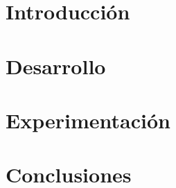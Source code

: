 \documentclass[a4paper, 10pt, twoside]{article}
\begin{document}
\newpage

\tableofcontents

\newpage

\section{Introducción}



\section{Desarrollo}



\section{Experimentaci\'on}





\section{Conclusiones}


\end{document}
